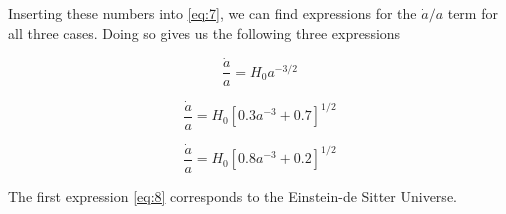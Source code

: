 \documentclass[a4paper,11.5pt,]{article}
\begin{document}
Inserting these numbers into \eqref{eq:7}, we can find expressions for the $\dot{a}/a$ term for all three cases. Doing so gives us the following three expressions

\begin{equation}\label{eq:8}
\frac{\dot{a}}{a} = H_0 a^{-3/2}
\end{equation}

\begin{equation}\label{eq:9}
\frac{\dot{a}}{a} = H_0 \left[0.3a^{-3} + 0.7\right]^{1/2}
\end{equation}

\begin{equation}\label{eq:10}
\frac{\dot{a}}{a} = H_0  \left[0.8a^{-3} + 0.2\right]^{1/2}
\end{equation}

The first expression \eqref{eq:8} corresponds to the Einstein-de Sitter Universe.
\end{document}
